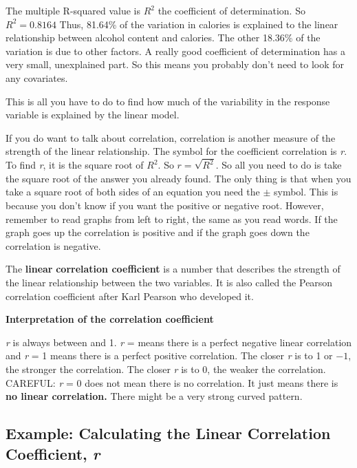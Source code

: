\documentclass[]{book}
\begin{document}
The multiple R-squared value is \(R^2\) the coefficient of determination. So \(R^2=0.8164\)
Thus, 81.64\% of the variation in calories is explained to the linear relationship between alcohol content and calories. The other 18.36\% of the variation is due to other factors. A really good coefficient of determination has a very small, unexplained part. So this means you probably don't need to look for any covariates.

This is all you have to do to find how much of the variability in the response variable is explained by the linear model.

If you do want to talk about correlation, correlation is another measure of the strength of the linear relationship. The symbol for the coefficient correlation is \emph{r}. To find \emph{r}, it is the square root of \(R^2\). So \(r=\sqrt{R^2}\). So all you need to do is take the square root of the answer you already found. The only thing is that when you take a square root of both sides of an equation you need the \(\pm\) symbol. This is because you don't know if you want the positive or negative root. However, remember to read graphs from left to right, the same as you read words. If the graph goes up the correlation is positive and if the graph goes down the correlation is negative.

The \textbf{linear} \textbf{correlation coefficient} is a number that describes the strength of the linear relationship between the two variables. It is also called the Pearson correlation coefficient after Karl Pearson who developed it.

\textbf{Interpretation of the correlation coefficient}

\emph{r} is always between and 1. \emph{r} = means there is a perfect negative linear correlation and \emph{r} = 1 means there is a perfect positive correlation. The closer \emph{r} is to 1 or \(-1\), the stronger the correlation. The closer \emph{r} is to 0, the weaker the correlation. CAREFUL: \emph{r} = 0 does not mean there is no correlation. It just means there is \textbf{no linear correlation.} There might be a very strong curved pattern.

\hypertarget{example-calculating-the-linear-correlation-coefficient-r}{%
\subsection{\texorpdfstring{Example: Calculating the Linear Correlation Coefficient, \emph{r}}{Example: Calculating the Linear Correlation Coefficient, r}}\label{example-calculating-the-linear-correlation-coefficient-r}}
\end{document}
